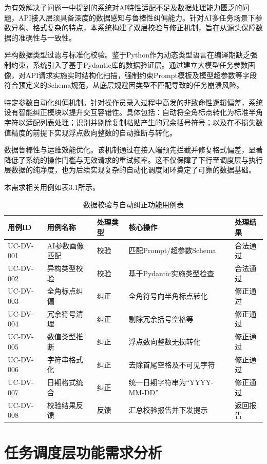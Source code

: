 为有效解决子问题一中提到的系统对AI特性适配不足及数据处理能力匮乏的问题，API接入层须具备深度的数据感知与鲁棒性纠偏能力。针对AI多任务场景下参数异构、格式复杂的特点，本系统构建了双层校验与修正机制，旨在从源头保障数据的准确性与一致性。

异构数据类型过滤与标准化校验。鉴于Python作为动态类型语言在编译期缺乏强制约束，系统引入了基于Pydantic库的数据验证层。通过建立大模型任务参数画像，对API请求实施实时结构化扫描，强制约束Prompt模板及模型超参数等字段符合预定义的Schema规范，从底层规避因类型不匹配导致的任务崩溃风险。

特定参数自动化纠偏机制。针对操作员录入过程中高发的非致命性逻辑偏差，系统设有智能纠正模块以提升交互容错性。具体包括：自动将全角标点转化为标准半角字符以适配列表处理；识别并剔除复制粘贴产生的冗余括号符号；以及在不损失数值精度的前提下实现浮点数向整数的自动推断与转化。

数据鲁棒性与运维效能优化。该机制通过在接入端预先拦截并修复格式偏差，显著降低了系统的操作门槛与无效请求的重试频率。这不仅保障了下行至调度层与执行层数据的纯净度，也为后续实现复杂的自动化调度闭环奠定了可靠的数据基础。

本需求相关用例如表3.1所示。

\begin{table}[htbp]
\centering
\caption{数据校验与自动纠正功能用例表}
\begin{tabularx}{\textwidth}{lllXl}
\toprule
\textbf{用例ID}&\textbf{用例名称}&\textbf{处理类型}&\textbf{核心操作}&\textbf{处理结果}\\
\midrule
UC-DV-001&AI参数画像匹配&校验&匹配Prompt/超参数Schema&合法通过\\
UC-DV-002&异构类型校验&校验&基于Pydantic实施类型检查&合法通过\\
UC-DV-003&全角标点纠偏&纠正&全角符号向半角标点转化&修正通过\\
UC-DV-004&冗余符号清理&纠正&剔除冗余括号空格等&修正通过\\
UC-DV-005&数值类型推断&纠正&浮点数向整数无损转化&修正通过\\
UC-DV-006&字符串格式化&纠正&去除首尾空格及不可见字符&修正通过\\
UC-DV-007&日期格式统合&纠正&统一日期字符串为“YYYY-MM-DD”&修正通过\\
UC-DV-008&校验结果反馈&反馈&汇总校验报告并下发提示&返回报告\\
\bottomrule
\end{tabularx}
\label{tab:data_validation_cases}
\end{table}

\section{任务调度层功能需求分析}

